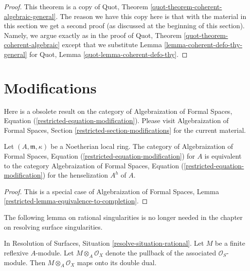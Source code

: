 \begin{proof}
This theorem is a copy of Quot, Theorem
\ref{quot-theorem-coherent-algebraic-general}.
The reason we have this copy here is that with the
material in this section we get a second proof (as discussed
at the beginning of this section). Namely,
we argue exactly as in the proof of
Quot, Theorem \ref{quot-theorem-coherent-algebraic}
except that we substitute
Lemma \ref{lemma-coherent-defo-thy-general} for
Quot, Lemma \ref{quot-lemma-coherent-defo-thy}.
\end{proof}







\section{Modifications}
\label{section-modifications}

\noindent
Here is a obsolete result on the category of
Algebraization of Formal Spaces, Equation
(\ref{restricted-equation-modification}).
Please visit Algebraization of Formal Spaces, Section
\ref{restricted-section-modifications}
for the current material.

\begin{lemma}
\label{lemma-henselian}
Let $(A, \mathfrak m, \kappa)$ be a Noetherian local ring.
The category of
Algebraization of Formal Spaces, Equation
(\ref{restricted-equation-modification})
for $A$ is equivalent to the category
Algebraization of Formal Spaces, Equation
(\ref{restricted-equation-modification})
for the henselization $A^h$ of $A$.
\end{lemma}

\begin{proof}
This is a special case of Algebraization of Formal Spaces, Lemma
\ref{restricted-lemma-equivalence-to-completion}.
\end{proof}

\noindent
The following lemma on rational singularities is no longer needed
in the chapter on resolving surface singularities.

\begin{lemma}
\label{lemma-double-dual-rational}
In Resolution of Surfaces, Situation \ref{resolve-situation-rational}.
Let $M$ be a finite reflexive $A$-module. Let $M \otimes_A \mathcal{O}_X$
denote the pullback of the associated $\mathcal{O}_S$-module. Then
$M \otimes_A \mathcal{O}_X$ maps onto its double dual.
\end{lemma}

